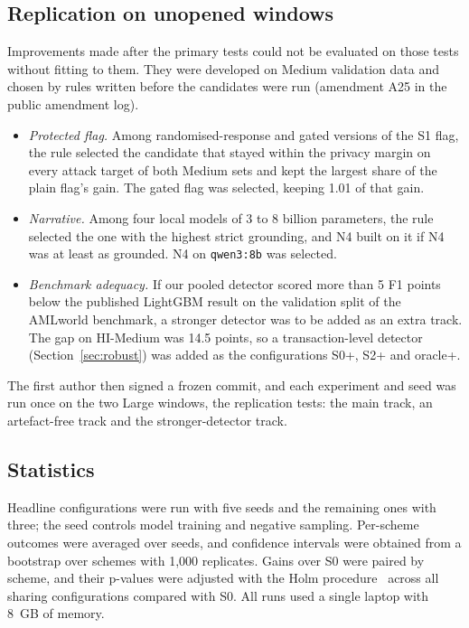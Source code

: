 \documentclass[conference]{IEEEtran}
\begin{document}
\subsection{Replication on unopened windows}\label{sec:a25}
Improvements made after the primary tests could not be evaluated on those tests without
fitting to them. They were developed on Medium validation data and chosen by rules written
before the candidates were run (amendment A25 in the public amendment log).
\begin{itemize}
\item \emph{Protected flag.} Among randomised-response and gated versions of the S1 flag, the
rule selected the candidate that stayed within the privacy margin on every attack target of
both Medium sets and kept the largest share of the plain flag's gain. The gated flag was
selected, keeping 1.01 of that gain.
\item \emph{Narrative.} Among four local models of 3 to 8 billion parameters, the rule
selected the one with the highest strict grounding, and N4 built on it if N4 was at least as
grounded. N4 on \texttt{qwen3:8b} was selected.
\item \emph{Benchmark adequacy.} If our pooled detector scored more than 5 F1 points below
the published LightGBM result on the validation split of the AMLworld benchmark, a stronger
detector was to be added as an extra track. The gap on HI-Medium was 14.5 points, so a
transaction-level detector (Section~\ref{sec:robust}) was added as the configurations S0+,
S2+ and oracle+.
\end{itemize}
The first author then signed a frozen commit, and each experiment and seed was run once on
the two Large windows, the replication tests: the main track, an artefact-free track and the
stronger-detector track.

\subsection{Statistics}
Headline configurations were run with five seeds and the remaining ones with three; the seed
controls model training and negative sampling. Per-scheme outcomes were averaged over seeds,
and confidence intervals were obtained from a bootstrap over schemes with 1,000 replicates.
Gains over S0 were paired by scheme, and their p-values were adjusted with the Holm
procedure~\cite{holm1979} across all sharing configurations compared with S0. All runs
used a single laptop with 8~GB of memory.
\end{document}
